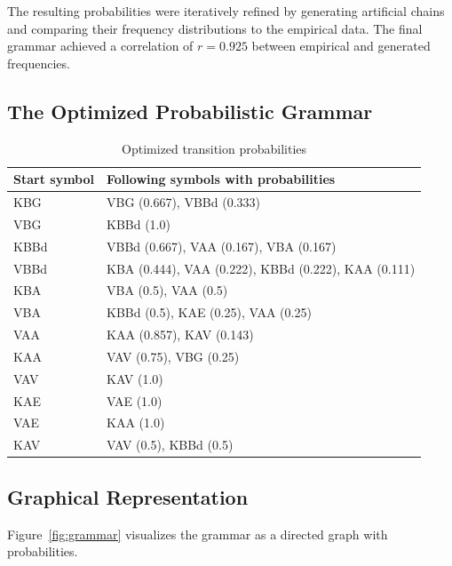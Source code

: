 \documentclass[12pt,a4paper]{article}
\begin{document}
The resulting probabilities were iteratively refined by generating artificial
chains and comparing their frequency distributions to the empirical data.
The final grammar achieved a correlation of \(r = 0.925\) between empirical
and generated frequencies.

\subsection{The Optimized Probabilistic Grammar}

\begin{table}[H]
\centering
\caption{Optimized transition probabilities}
\label{tab:grammar}
\begin{tabular}{@{} l l @{}}
\toprule
\textbf{Start symbol} & \textbf{Following symbols with probabilities} \\
\midrule
KBG & VBG (0.667), VBBd (0.333) \\
VBG & KBBd (1.0) \\
KBBd & VBBd (0.667), VAA (0.167), VBA (0.167) \\
VBBd & KBA (0.444), VAA (0.222), KBBd (0.222), KAA (0.111) \\
KBA & VBA (0.5), VAA (0.5) \\
VBA & KBBd (0.5), KAE (0.25), VAA (0.25) \\
VAA & KAA (0.857), KAV (0.143) \\
KAA & VAV (0.75), VBG (0.25) \\
VAV & KAV (1.0) \\
KAE & VAE (1.0) \\
VAE & KAA (1.0) \\
KAV & VAV (0.5), KBBd (0.5) \\
\bottomrule
\end{tabular}
\end{table}

\subsection{Graphical Representation}

Figure~\ref{fig:grammar} visualizes the grammar as a directed graph with
probabilities.
\end{document}
